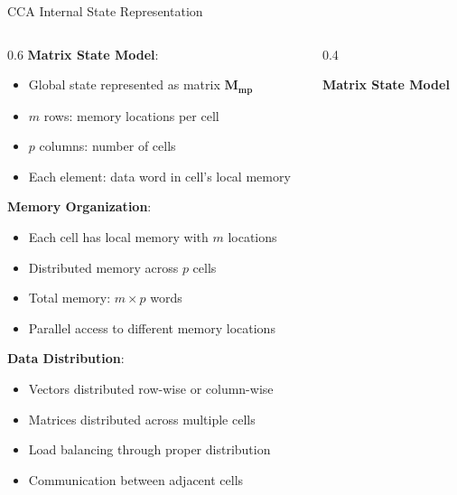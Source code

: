 \documentclass[aspectratio=169]{beamer}
\newcommand{\concept}[1]{\textbf{\color{darkblue}#1}}
\begin{document}
\begin{frame}{CCA Internal State Representation}
\begin{columns}
\begin{column}{0.6\textwidth}
\concept{Matrix State Model}:
\begin{itemize}
\item Global state represented as matrix $\mathbf{M_{mp}}$
\item $m$ rows: memory locations per cell
\item $p$ columns: number of cells
\item Each element: data word in cell's local memory
\end{itemize}

\vspace{0.3cm}
\concept{Memory Organization}:
\begin{itemize}
\item Each cell has local memory with $m$ locations
\item Distributed memory across $p$ cells
\item Total memory: $m \times p$ words
\item Parallel access to different memory locations
\end{itemize}

\vspace{0.3cm}
\concept{Data Distribution}:
\begin{itemize}
\item Vectors distributed row-wise or column-wise
\item Matrices distributed across multiple cells
\item Load balancing through proper distribution
\item Communication between adjacent cells
\end{itemize}
\end{column}
\begin{column}{0.4\textwidth}
\begin{center}
\textbf{Matrix State Model}
\vspace{0.3cm}

\end{center}
\end{column}
\end{columns}
\end{frame}
\end{document}
